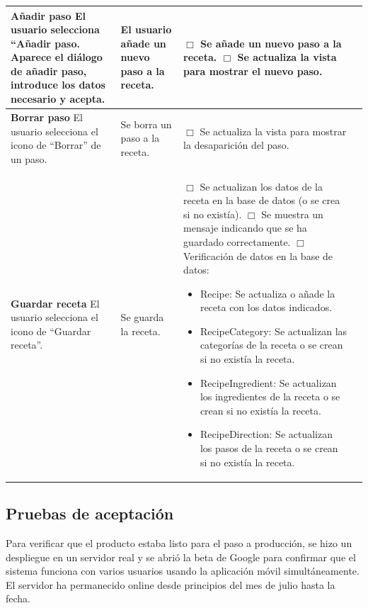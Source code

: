 \begin{center}
\begin{longtable}{|p{3.75cm}|p{3.5cm}|p{5.25cm}|p{1.5cm}|}
    \textbf{Añadir paso}\newline
    El usuario selecciona ``Añadir paso. Aparece el diálogo de añadir
    paso, introduce los datos necesario y acepta. &
    El usuario añade un nuevo paso a la receta. &
    $\Box$ Se añade un nuevo paso a la receta.\newline
    $\Box$ Se actualiza la vista para mostrar el nuevo paso.
    & \\ \hline

    \textbf{Borrar paso}\newline
    El usuario selecciona el icono de ``Borrar'' de un paso. &
    Se borra un paso a la receta. &
    $\Box$ Se actualiza la vista para mostrar la desaparición del paso.
    & \\ \hline
    
    \textbf{Guardar receta}\newline
    El usuario selecciona el icono de ``Guardar receta''. &
    Se guarda la receta. &
    $\Box$ Se actualizan los datos de la receta en la base de datos (o se
    crea si no existía).\newline
    $\Box$ Se muestra un mensaje indicando que se ha guardado
    correctamente.\newline
    $\Box$ Verificación de datos en la base de datos:
    \begin{itemize}
    \item Recipe: Se actualiza o añade la receta con los datos indicados.
    \item RecipeCategory: Se actualizan las categorías de la receta o se crean
      si no existía la receta.
    \item RecipeIngredient: Se actualizan los ingredientes de la receta o se
      crean si no existía la receta.
    \item RecipeDirection: Se actualizan los pasos de la receta o se crean
      si no existía la receta.
    \end{itemize}    
    & \\ \hline
  \end{longtable}
\end{center}

    
\subsection{Pruebas de aceptación}

Para verificar que el producto estaba listo para el paso a producción, se hizo
un despliegue en un servidor real y se abrió la beta de Google para confirmar
que el sistema funciona con varios usuarios usando la aplicación móvil
simultáneamente. El servidor ha permanecido online desde principios del mes de
julio hasta la fecha.


